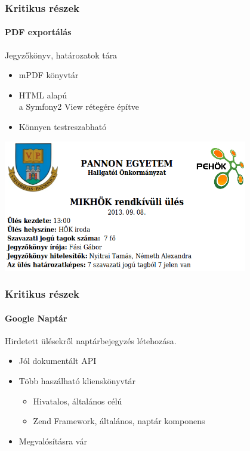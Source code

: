 \documentclass[12pt]{beamer}
\begin{document}
\begin{frame}
    \frametitle{Kritikus részek}
    \framesubtitle{PDF exportálás}
    
    \large
    Jegyzőkönyv, határozatok tára
    
    \begin{itemize}
        \item mPDF könyvtár
        \item HTML alapú\\
            \small a Symfony2 View rétegére építve
        \large
        \item Könnyen testreszabható
    \end{itemize}

    \begin{center}
        \includegraphics[center,width=0.8\textwidth,center]{jegyzokonyv-fejlec.png}
    \end{center}
\end{frame}

\begin{frame}
    \frametitle{Kritikus részek}
    \framesubtitle{Google Naptár}
    \large
    
    Hirdetett ülésekről naptárbejegyzés létehozása.
    
    \begin{itemize}
        \item Jól dokumentált API
        \item Több haszálható klienskönyvtár\\
        \begin{itemize}
        	\item Hivatalos, általános célú
        	\item Zend Framework, általános, naptár komponens
        \end{itemize}            
        \item Megvalósításra vár
    \end{itemize}
\end{frame}
\end{document}
